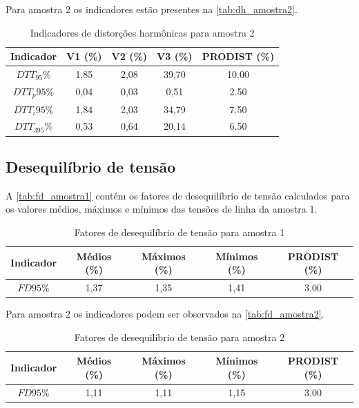 Para amostra 2 os indicadores estão presentes na \autoref{tab:dh_amostra2}.

\begin{table}[H]
  \centering
  \caption{Indicadores de distorções harmônicas para amostra 2}
  \label{tab:dh_amostra2}
  \begin{tabular}{@{}ccccc@{}}
    \toprule
    Indicador & V1 (\%) & V2 (\%) & V3 (\%) & PRODIST  (\%) \\
    \midrule
    $DTT_95\%$   & 1,85 & 2,08 & 39,70 & 10.00 \\
    $DTT_p95\%$ & 0,04 & 0,03 & 0,51 & 2.50 \\
    $DTT_i95\%$ & 1,84 & 2,03 & 34,79 & 7.50 \\
    $DTT_395\%$ & 0,53 & 0,64 & 20,14 & 6.50 \\
    \bottomrule
  \end{tabular}
\end{table}

\subsection{Desequilíbrio de tensão}

A \autoref{tab:fd_amostra1} contém os fatores de desequilíbrio de tensão calculados para os valores médios, máximos e mínimos das tensões de linha da amostra 1.

\begin{table}[H]
  \centering
  \caption{Fatores de desequilíbrio de tensão para amostra 1}
  \label{tab:fd_amostra1}
  \begin{tabular}{@{}ccccc@{}}
    \toprule
    Indicador & Médios (\%) & Máximos (\%) & Mínimos (\%) & PRODIST (\%) \\
    \midrule
    $FD95\%$  & 1,37 & 1,35 & 1,41 & 3.00 \\
    \bottomrule
  \end{tabular}
\end{table}

Para amostra 2 os indicadores podem ser observados na \autoref{tab:fd_amostra2}.

\begin{table}[H]
  \centering
  \caption{Fatores de desequilíbrio de tensão para amostra 2}
  \label{tab:fd_amostra2}
  \begin{tabular}{@{}ccccc@{}}
    \toprule
    Indicador & Médios (\%) & Máximos (\%) & Mínimos (\%) & PRODIST (\%) \\
    \midrule
    $FD95\%$  & 1,11 & 1,11 & 1,15 & 3.00 \\
    \bottomrule
  \end{tabular}
\end{table}

